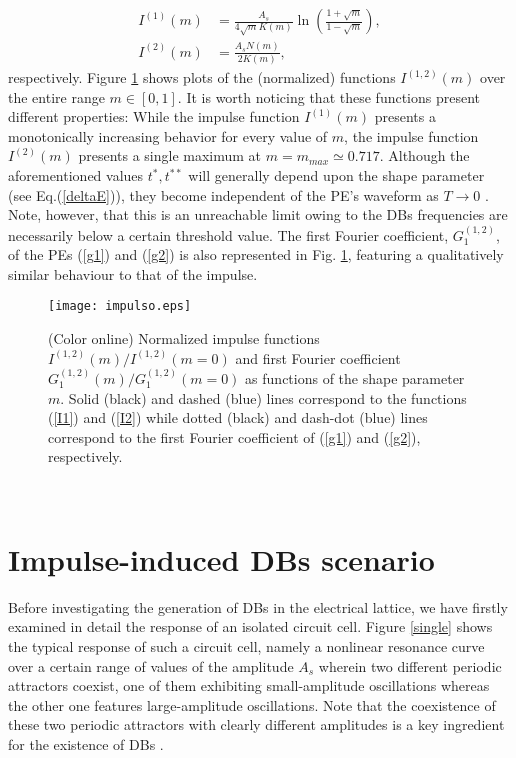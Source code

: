 \documentclass[showpacs,preprintnumbers,10pt,onecolumn]{revtex4}%
\begin{document}
\begin{align}
I^{(1)}(m) &  =\frac{A_{s}}{4\sqrt{m}K(m)}\ln\left(  \frac{1+\sqrt{m}}%
{1-\sqrt{m}}\right)  ,\label{I1}\\
I^{(2)}(m) &  =\frac{A_{s}N(m)}{2K(m)},\label{I2}%
\end{align}
respectively. Figure \ref{impulso} shows plots of the (normalized) functions
$I^{(1,2)}(m)$ over the entire range $m\in\left[  0,1\right]  $. It is worth
noticing that these functions present different properties: While the impulse
function $I^{(1)}\left(  m\right)  $ presents a monotonically increasing behavior
for every value of $m$, the impulse function $I^{(2)}\left(
m\right)  $ presents a single maximum at $m=m_{max}\simeq0.717$. Although the
aforementioned values $t^{\ast},t^{\ast\ast}$ will generally depend upon
the shape parameter (see Eq.(\ref{deltaE})), they become independent of the
PE's waveform as $T\rightarrow0$ \cite{6,7}. Note, however, that this is an
unreachable limit owing to the DBs frequencies are necessarily below a certain
threshold value.
The first Fourier coefficient, $G^{(1,2)}_1$, of the PEs (\ref{g1}) and
(\ref{g2}) is also represented in Fig. \ref{impulso}, featuring a qualitatively similar behaviour to that of the impulse.

\begin{figure}[ptb]
\texttt{[image: impulso.eps]}\caption{(Color online)
Normalized impulse functions $I^{(1,2)}(m)/I^{(1,2)}(m=0)$
and first Fourier coefficient $G^{(1,2)}_1(m)/G^{(1,2)}_1(m=0)$ as
functions of the shape parameter $m$. Solid (black) and dashed (blue) lines
correspond to the functions (\ref{I1}) and (\ref{I2}) while
dotted (black) and dash-dot (blue) lines correspond to the
first Fourier coefficient of (\ref{g1}) and (\ref{g2}), respectively.}%
\label{impulso}%
\end{figure}\

\section{Impulse-induced DBs scenario} Before investigating the generation
of DBs in the electrical lattice, we have firstly examined in detail the response of an
isolated circuit cell. Figure \ref{single} shows the typical
response of such a circuit cell, namely a nonlinear resonance
curve over a certain range of values of the amplitude $A_{s}$ wherein two
different periodic attractors coexist, one of them exhibiting small-amplitude
oscillations whereas the other one features large-amplitude oscillations. Note that the
coexistence of these two periodic attractors with clearly different amplitudes
is a key ingredient for the existence of DBs \cite{breather_reviews}.
\end{document}
